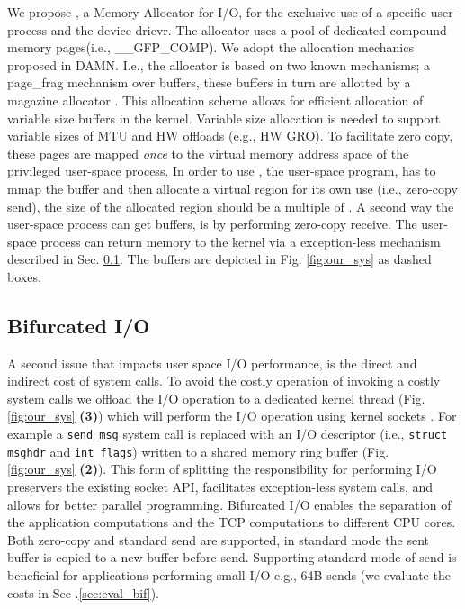 We propose \oursys, a Memory Allocator for I/O, for the  exclusive use of a specific user-process and the device drievr. The \oursys allocator uses a pool of dedicated compound memory pages(i.e., \_\_GFP\_COMP). We adopt the allocation mechanics proposed in DAMN\cite{markuze2018damn}. I.e., the allocator is based on two known mechanisms; a page\_frag mechanism \cite{pagefrag} over \size buffers, these buffers in turn are allotted by a magazine allocator \cite{bonwick2001magazines}. This allocation scheme allows for efficient allocation of variable size buffers in the kernel. Variable size allocation is needed to support variable sizes of MTU and HW offloads (e.g., HW GRO). To facilitate zero copy, these pages are mapped \emph{once} to the virtual memory address space of the privileged user-space process. In order to use \oursys, the user-space program, has to mmap the \oursys buffer and then allocate a virtual region for its own use (i.e., zero-copy send), the size of the allocated region should be a multiple of \size. A second way the user-space process can get \oursys buffers, is by performing zero-copy receive. The user-space process can return memory to the kernel via a exception-less mechanism described in Sec. \ref{sec:bifurcated}.
The \oursys buffers are depicted in Fig. \ref{fig:our_sys} as dashed boxes.
\subsection{Bifurcated I/O}\label{sec:bifurcated}
A second issue that impacts user space I/O performance, is the direct and indirect cost of system calls\cite{flexsc}.
To avoid the costly operation of invoking a costly system calls we offload the I/O operation to a dedicated kernel thread (Fig. \ref{fig:our_sys} \textbf{(3)}) which will perform the I/O operation using kernel sockets \cite{ktcp}. For example a \texttt{send\_msg} system call is replaced with an I/O descriptor (i.e., \texttt{struct msghdr} and \texttt{int flags}) written to a shared memory ring buffer (Fig. \ref{fig:our_sys} \textbf{(2)}). This form of splitting the responsibility for performing I/O preservers the existing socket API, facilitates exception-less system calls, and allows for better parallel programming. Bifurcated I/O enables the separation of the application computations and the TCP computations to different CPU cores. Both zero-copy and standard send are supported, in standard mode the sent buffer is copied to a new \oursys buffer before send. Supporting standard mode of send is beneficial for applications performing small I/O e.g., 64B sends (we evaluate the costs in Sec .\ref{sec:eval_bif}).

